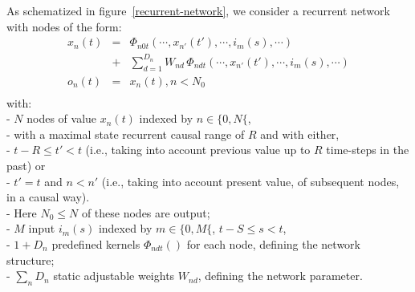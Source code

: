 As schematized in figure~\ref{recurrent-network}, we consider a recurrent network with nodes of the form:
\begin{equation}\label{eq-recurrent}
\begin{array}{rcl} 
x_n(t) &=&  \Phi_{n0t}\left(\cdots, x_{n'}(t'), \cdots, i_{m}(s), \cdots\right) \\ 
          &+& \sum_{d = 1}^{D_{n}} W_{nd} \, \Phi_{ndt}\left(\cdots, x_{n'}(t'), \cdots, i_{m}(s), \cdots\right) \\
o_n(t) &=& x_n(t), n < N_0 \\
 \end{array}
\end{equation} with:
 \\  -  $N$ nodes of value $x_{n}(t)$ indexed by $n \in \{0, N\{$, 
 \\  \hphantom{0.5cm} -  with a maximal state recurrent causal range of $R$ and with either,  
 \\  \hphantom{0.8cm} -  $t - R \leq t' < t$ (i.e., taking into account previous value up to $R$ time-steps in the past) or
 \\  \hphantom{0.8cm} -  $t' = t$ and $n < n'$ (i.e., taking into account present value, of subsequent nodes, in a causal way).
 \\  \hphantom{0.5cm} - Here $N_0 \leq N$ of these nodes are output;
 \\  - $M$ input $i_{m}(s)$ indexed by $m \in \{0, M\{$, $t - S \leq  s < t$, 
 \\  - $1 + D_{n}$ predefined kernels $\Phi_{ndt}\left(\right)$ for each node, defining the network structure;
 \\  - $\sum_n D_n$ static adjustable weights $W_{nd}$, defining the network parameter.

\vphantom{1cm}

